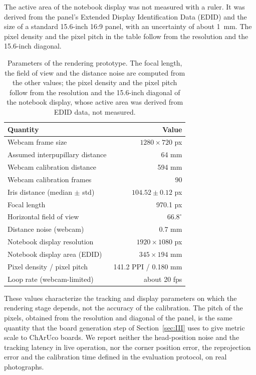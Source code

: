 \documentclass[english,hidelinks]{sbrt}
\begin{document}
The active area of the notebook display was not measured with a ruler. It was derived from the panel's Extended Display Identification Data (EDID) and the size of a standard 15.6-inch 16:9 panel, with an uncertainty of about 1~mm. The pixel density and the pixel pitch in the table follow from the resolution and the 15.6-inch diagonal.

\begin{table}[t]
\centering
\small
\caption{Parameters of the rendering prototype. The focal length, the field of view and the distance noise are computed from the other values; the pixel density and the pixel pitch follow from the resolution and the 15.6-inch diagonal of the notebook display, whose active area was derived from EDID data, not measured.}
\label{tab:results}
\begin{tabular}{lr}
\hline
Quantity & Value \\
\hline
Webcam frame size & $1280\times720$ px \\
Assumed interpupillary distance & 64 mm \\
Webcam calibration distance & 594 mm \\
Webcam calibration frames & 90 \\
Iris distance (median $\pm$ std) & $104.52 \pm 0.12$ px \\
Focal length & 970.1 px \\
Horizontal field of view & $66.8^\circ$ \\
Distance noise (webcam) & 0.7 mm \\
Notebook display resolution & $1920\times1080$ px \\
Notebook display area (EDID) & $345\times194$ mm \\
Pixel density / pixel pitch & 141.2 PPI / 0.180 mm \\
Loop rate (webcam-limited) & about 20 fps \\
\hline
\end{tabular}
\end{table}

These values characterize the tracking and display parameters on which the rendering stage depends, not the accuracy of the calibration. The pitch of the pixels, obtained from the resolution and diagonal of the panel, is the same quantity that the board generation step of Section~\ref{sec:III} uses to give metric scale to ChArUco boards. We report neither the head-position noise and the tracking latency in live operation, nor the corner position error, the reprojection error and the calibration time defined in the evaluation protocol, on real photographs.
\end{document}
